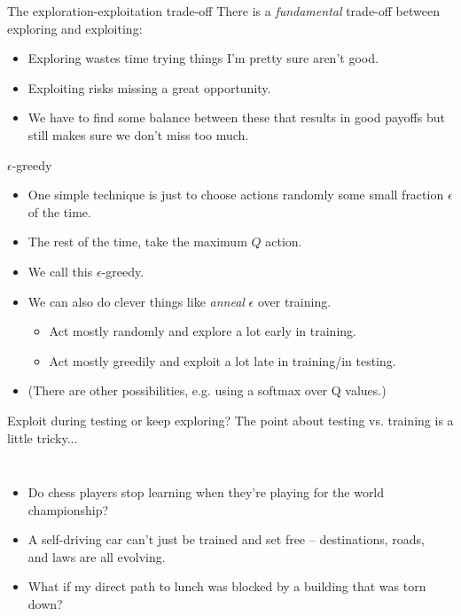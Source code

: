 \documentclass{beamer} %
\begin{document}
\begin{frame}{The exploration-exploitation trade-off}
There is a \emph{fundamental} trade-off between exploring and exploiting:
\begin{itemize}
    \item<2-> Exploring wastes time trying things I'm pretty sure aren't good.
    \item<3-> Exploiting risks missing a great opportunity.
    \item<4-> We have to find some balance between these that results in good payoffs but still makes sure we don't miss too much.
\end{itemize}
\end{frame}

\begin{frame}{\(\epsilon\)-greedy}
\begin{itemize}
    \item One simple technique is just to choose actions randomly some small fraction \(\epsilon\) of the time. 
    \item<2-> The rest of the time, take the maximum \(Q\) action. 
    \item<3-> We call this \(\epsilon\)-greedy.
    \item<4-> We can also do clever things like \emph{anneal} \(\epsilon\) over training.
        \begin{itemize} 
        \item Act mostly randomly and explore a lot early in training.
        \item Act mostly greedily and exploit a lot late in training/in testing.
        \end{itemize}
    \item<5-> (There are other possibilities, e.g. using a softmax over Q values.)
\end{itemize}
\end{frame}

\begin{frame}{Exploit during testing or keep exploring?}
The point about testing vs. training is a little tricky... 
\begin{columns}
\begin{itemize}
    \item<1-> Do chess players stop learning when they're playing for the world championship? 
    \item<2-> A self-driving car can't just be trained and set free -- destinations, roads, and laws are all evolving.
    \item<3-> What if my direct path to lunch was blocked by a building that was torn down? 
\end{itemize}
    \begin{center}
    \end{center}
\end{columns}
\end{frame}
\end{document}
